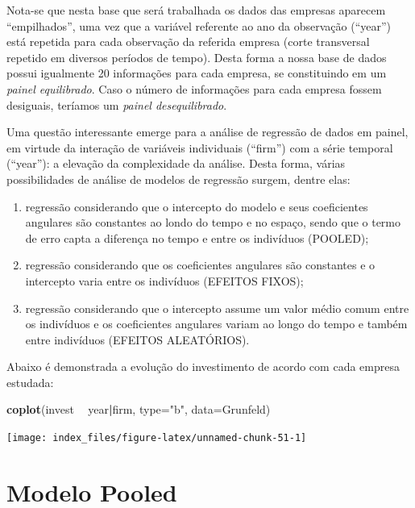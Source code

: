\documentclass[12pt,brazil,oneside]{book}
\newenvironment{Shaded}{\begin{snugshade}}{\end{snugshade}}
\newcommand{\DataTypeTok}[1]{\textcolor[rgb]{0.13,0.29,0.53}{#1}}
\newcommand{\KeywordTok}[1]{\textcolor[rgb]{0.13,0.29,0.53}{\textbf{#1}}}
\newcommand{\NormalTok}[1]{#1}
\newcommand{\OperatorTok}[1]{\textcolor[rgb]{0.81,0.36,0.00}{\textbf{#1}}}
\newcommand{\StringTok}[1]{\textcolor[rgb]{0.31,0.60,0.02}{#1}}
\begin{document}
Nota-se que nesta base que será trabalhada os dados das empresas aparecem ``empilhados'', uma vez que a variável referente ao ano da observação (``year'') está repetida para cada observação da referida empresa (corte transversal repetido em diversos períodos de tempo). Desta forma a nossa base de dados possui igualmente 20 informações para cada empresa, se constituindo em um \emph{painel equilibrado}. Caso o número de informações para cada empresa fossem desiguais, teríamos um \emph{painel desequilibrado}.

Uma questão interessante emerge para a análise de regressão de dados em painel, em virtude da interação de variáveis individuais (``firm'') com a série temporal (``year''): a elevação da complexidade da análise. Desta forma, várias possibilidades de análise de modelos de regressão surgem, dentre elas:

\begin{enumerate}
\def\labelenumi{\alph{enumi})}
\item
  regressão considerando que o intercepto do modelo e seus coeficientes angulares são constantes ao londo do tempo e no espaço, sendo que o termo de erro capta a diferença no tempo e entre os indivíduos (POOLED);
\item
  regressão considerando que os coeficientes angulares são constantes e o intercepto varia entre os indivíduos (EFEITOS FIXOS);
\item
  regressão considerando que o intercepto assume um valor médio comum entre os indivíduos e os coeficientes angulares variam ao longo do tempo e também entre indivíduos (EFEITOS ALEATÓRIOS).
\end{enumerate}

Abaixo é demonstrada a evolução do investimento de acordo com cada empresa estudada:

\begin{Shaded}
\begin{Highlighting}[]
\KeywordTok{coplot}\NormalTok{(invest }\OperatorTok{~}\StringTok{ }\NormalTok{year}\OperatorTok{|}\NormalTok{firm, }\DataTypeTok{type=}\StringTok{"b"}\NormalTok{, }\DataTypeTok{data=}\NormalTok{Grunfeld)}
\end{Highlighting}
\end{Shaded}

\begin{center}\texttt{[image: index\_files/figure-latex/unnamed-chunk-51-1]} \end{center}

\hypertarget{modelo-pooled}{%
\section{Modelo Pooled}\label{modelo-pooled}}
\end{document}
